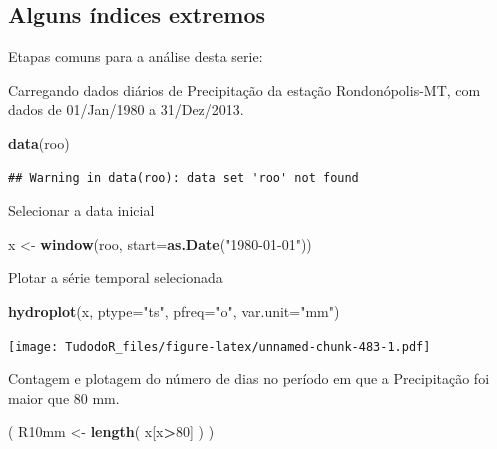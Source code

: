\documentclass[
]{book}
\newenvironment{Shaded}{\begin{snugshade}}{\end{snugshade}}
\newcommand{\DataTypeTok}[1]{\textcolor[rgb]{0.13,0.29,0.53}{#1}}
\newcommand{\DecValTok}[1]{\textcolor[rgb]{0.00,0.00,0.81}{#1}}
\newcommand{\KeywordTok}[1]{\textcolor[rgb]{0.13,0.29,0.53}{\textbf{#1}}}
\newcommand{\NormalTok}[1]{#1}
\newcommand{\OperatorTok}[1]{\textcolor[rgb]{0.81,0.36,0.00}{\textbf{#1}}}
\newcommand{\StringTok}[1]{\textcolor[rgb]{0.31,0.60,0.02}{#1}}
\begin{document}
\hypertarget{alguns-uxedndices-extremos}{%
\subsection{Alguns índices extremos}\label{alguns-uxedndices-extremos}}

Etapas comuns para a análise desta serie:

Carregando dados diários de Precipitação da estação Rondonópolis-MT, com dados de 01/Jan/1980 a 31/Dez/2013.

\begin{Shaded}
\begin{Highlighting}[]
\KeywordTok{data}\NormalTok{(roo)}
\end{Highlighting}
\end{Shaded}

\begin{verbatim}
## Warning in data(roo): data set 'roo' not found
\end{verbatim}

Selecionar a data inicial

\begin{Shaded}
\begin{Highlighting}[]
\NormalTok{x <-}\StringTok{ }\KeywordTok{window}\NormalTok{(roo, }\DataTypeTok{start=}\KeywordTok{as.Date}\NormalTok{(}\StringTok{"1980-01-01"}\NormalTok{))}
\end{Highlighting}
\end{Shaded}

Plotar a série temporal selecionada

\begin{Shaded}
\begin{Highlighting}[]
\KeywordTok{hydroplot}\NormalTok{(x, }\DataTypeTok{ptype=}\StringTok{"ts"}\NormalTok{, }\DataTypeTok{pfreq=}\StringTok{"o"}\NormalTok{, }\DataTypeTok{var.unit=}\StringTok{"mm"}\NormalTok{)}
\end{Highlighting}
\end{Shaded}

\texttt{[image: TudodoR\_files/figure-latex/unnamed-chunk-483-1.pdf]}

Contagem e plotagem do número de dias no período em que a Precipitação foi maior que 80 mm.

\begin{Shaded}
\begin{Highlighting}[]
\NormalTok{( R10mm <-}\StringTok{ }\KeywordTok{length}\NormalTok{( x[x}\OperatorTok{>}\DecValTok{80}\NormalTok{] ) )}
\end{Highlighting}
\end{Shaded}
\end{document}
